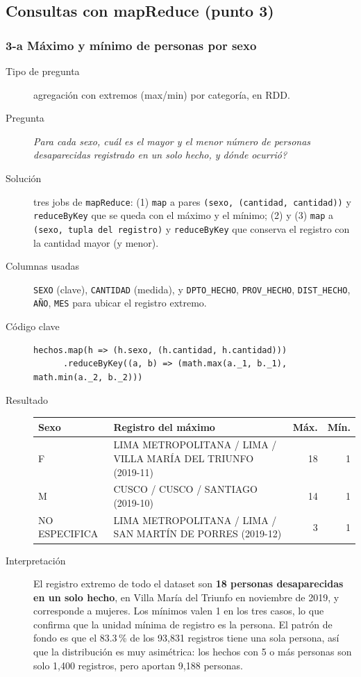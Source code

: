 \subsection{Consultas con mapReduce (punto 3)}

\subsubsection*{3-a \textbar{} M\'aximo y m\'inimo de personas por sexo}
\begin{description}
\item[Tipo de pregunta] agregaci\'on con extremos (max/min) por categor\'ia, en RDD.
\item[Pregunta] \emph{Para cada sexo, cu\'al es el mayor y el menor n\'umero de personas
      desaparecidas registrado en un solo hecho, y d\'onde ocurri\'o?}
\item[Soluci\'on] tres jobs de \texttt{mapReduce}: (1) \texttt{map} a pares
      \texttt{(sexo, (cantidad, cantidad))} y \texttt{reduceByKey} que se queda con el m\'aximo y
      el m\'inimo; (2) y (3) \texttt{map} a \texttt{(sexo, tupla del registro)} y
      \texttt{reduceByKey} que conserva el registro con la cantidad mayor (y menor).
\item[Columnas usadas] \texttt{SEXO} (clave), \texttt{CANTIDAD} (medida), y
      \texttt{DPTO\_HECHO}, \texttt{PROV\_HECHO}, \texttt{DIST\_HECHO}, \texttt{A\~NO},
      \texttt{MES} para ubicar el registro extremo.
\item[C\'odigo clave]
\begin{lstlisting}[style=scala]
hechos.map(h => (h.sexo, (h.cantidad, h.cantidad)))
      .reduceByKey((a, b) => (math.max(a._1, b._1), math.min(a._2, b._2)))
\end{lstlisting}
\item[Resultado]
\begin{center}
\begin{tabular}{lp{5.6cm}rr}
\toprule
Sexo & Registro del m\'aximo & M\'ax. & M\'in.\\
\midrule
F & LIMA METROPOLITANA / LIMA / VILLA MAR\'IA DEL TRIUNFO (2019-11) & 18 & 1\\
M & CUSCO / CUSCO / SANTIAGO (2019-10) & 14 & 1\\
NO ESPECIFICA & LIMA METROPOLITANA / LIMA / SAN MART\'IN DE PORRES (2019-12) & 3 & 1\\
\bottomrule
\end{tabular}
\end{center}
\item[Interpretaci\'on] El registro extremo de todo el dataset son \textbf{18 personas
      desaparecidas en un solo hecho}, en Villa Mar\'ia del Triunfo en noviembre de 2019, y
      corresponde a mujeres. Los m\'inimos valen 1 en los tres casos, lo que confirma que la
      unidad m\'inima de registro es la persona. El patr\'on de fondo es que el 83.3\,\% de los
      93,831 registros tiene una sola persona, as\'i que la distribuci\'on es muy asim\'etrica:
      los hechos con 5 o m\'as personas son solo 1,400 registros, pero aportan 9,188 personas.
\end{description}


